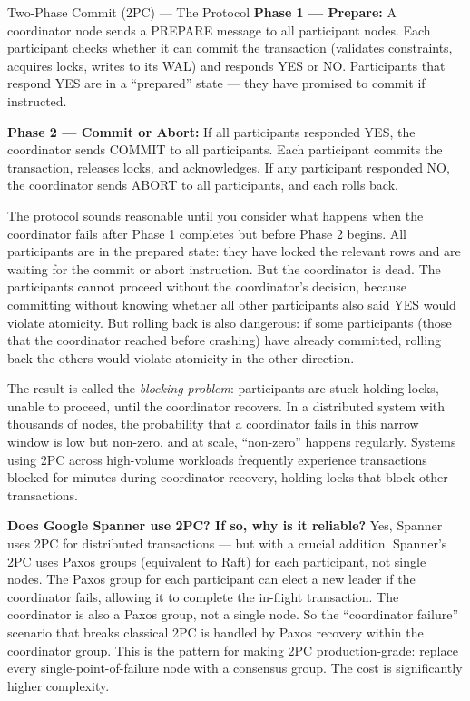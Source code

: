 \documentclass[11pt,a4paper]{article}
\begin{document}
\begin{termbox}{Two-Phase Commit (2PC) --- The Protocol}
\textbf{Phase 1 --- Prepare:} A coordinator node sends a PREPARE message to all participant nodes. Each participant checks whether it can commit the transaction (validates constraints, acquires locks, writes to its WAL) and responds YES or NO. Participants that respond YES are in a ``prepared'' state --- they have promised to commit if instructed.

\textbf{Phase 2 --- Commit or Abort:} If all participants responded YES, the coordinator sends COMMIT to all participants. Each participant commits the transaction, releases locks, and acknowledges. If any participant responded NO, the coordinator sends ABORT to all participants, and each rolls back.
\end{termbox}

The protocol sounds reasonable until you consider what happens when the coordinator fails after Phase 1 completes but before Phase 2 begins. All participants are in the prepared state: they have locked the relevant rows and are waiting for the commit or abort instruction. But the coordinator is dead. The participants cannot proceed without the coordinator's decision, because committing without knowing whether all other participants also said YES would violate atomicity. But rolling back is also dangerous: if some participants (those that the coordinator reached before crashing) have already committed, rolling back the others would violate atomicity in the other direction.

The result is called the \textit{blocking problem}: participants are stuck holding locks, unable to proceed, until the coordinator recovers. In a distributed system with thousands of nodes, the probability that a coordinator fails in this narrow window is low but non-zero, and at scale, ``non-zero'' happens regularly. Systems using 2PC across high-volume workloads frequently experience transactions blocked for minutes during coordinator recovery, holding locks that block other transactions.

\begin{thinkbox}
\textbf{Does Google Spanner use 2PC? If so, why is it reliable?} Yes, Spanner uses 2PC for distributed transactions --- but with a crucial addition. Spanner's 2PC uses Paxos groups (equivalent to Raft) for each participant, not single nodes. The Paxos group for each participant can elect a new leader if the coordinator fails, allowing it to complete the in-flight transaction. The coordinator is also a Paxos group, not a single node. So the ``coordinator failure'' scenario that breaks classical 2PC is handled by Paxos recovery within the coordinator group. This is the pattern for making 2PC production-grade: replace every single-point-of-failure node with a consensus group. The cost is significantly higher complexity.
\end{thinkbox}
\end{document}
